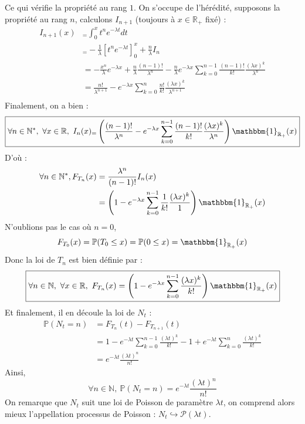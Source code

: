 \documentclass[a4paper, titlepage]{livret} %
\begin{document}
				Ce qui vérifie la propriété au rang $1$.
				On s'occupe de l'hérédité, supposons la propriété au rang $n$, calculons $I_{n+1}$ (toujours à $x \in \mathbb{R}_{+}$ fixé) :
				\[\begin{aligned}
					I_{n+1}(x) &_= \int_{0}^{x} t^{n} e^{-\lambda t}dt \\
						  	   &_= -\frac{1}{\lambda}\left[t^{n} e^{-\lambda t}\right]_{0}^{x} + \frac{n}{\lambda} I_{n}\\
						  	   & = -\frac{x^{n}}{\lambda}e^{-\lambda x} + \frac{n}{\lambda}\frac{(n-1)!}{\lambda^{n}} - \frac{n}{\lambda}e^{-\lambda x} \sum_{k = 0}^{n-1} \frac{(n-1)!}{k!}\frac{(\lambda x)^{k}}{\lambda^{n}}\\
						  	   & = \frac{n!}{\lambda^{n+1}} - e^{-\lambda x} \sum_{k = 0}^{n} \frac{n!}{k!}\frac{(\lambda x)^{k}}{\lambda^{n+1}}\\
				\end{aligned}\]
				Finalement, on a bien :
				\[\boxed{
					\forall n \in \mathbb{N}^{*}, \ \forall x \in \mathbb{R}, \ I_{n}(x)_= \left(\frac{(n-1)!}{\lambda^{n}} -e^{-\lambda x} \sum_{k = 0}^{n-1} \frac{(n-1)!}{k!}\frac{(\lambda x)^{k}}{\lambda^{n}}\right)\mathbbm{1}_{\mathbb{R}_{+}}(x)
				}\]
				D'où :
				\[\begin{aligned}
					\forall n \in \mathbb{N}^{*}, F_{T_{n}}(x) & = \frac{\lambda^{n}}{(n-1)!} I_{n}(x)\\
															   & = \left(1 -e^{-\lambda x} \sum_{k = 0}^{n-1} \frac{1}{k!}\frac{(\lambda x)^{k}}{1}\right)\mathbbm{1}_{\mathbb{R}_{+}}(x)\\
				\end{aligned}\]
				N'oublions pas le cas où $n = 0$,
				\[
					F_{T_{0}}(x) = \mathbb{P}(T_{0} \leq x) = \mathbb{P}(0 \leq x) = \mathbbm{1}_{\mathbb{R}_{+}}(x)
				\]
				Donc la loi de $T_{n}$ est bien définie par :
				\[\boxed{
					\forall n \in \mathbb{N}, \ \forall x \in \mathbb{R}, \ F_{T_{n}}(x) = \left(1 -e^{-\lambda x} \sum_{k = 0}^{n-1} \frac{(\lambda x)^{k}}{k!}\right)\mathbbm{1}_{\mathbb{R}_{+}}(x)\\
				}\]
				Et finalement, il en découle la loi de $N_{t}$ :
				\[\begin{aligned}
					\mathbb{P}(N_{t} = n) & = F_{T_{n}}(t) - F_{T_{n+1}}(t)\\
										  & = 1 -e^{-\lambda t} \sum_{k = 0}^{n-1} \frac{(\lambda t)^{k}}{k!} - 1 + e^{-\lambda t} \sum_{k = 0}^{n} \frac{(\lambda t)^{k}}{k!}\\
										  & = e^{-\lambda t}\frac{(\lambda t)^{n}}{n!}
				\end{aligned}\]
				Ainsi,
				\[\boxed{
					\forall n \in \mathbb{N}, \ \mathbb{P}(N_{t} = n) = e^{-\lambda t}\frac{(\lambda t)^{n}}{n!}
				}\]
				On remarque que $N_{t}$ suit une loi de Poisson de paramètre $\lambda t$, on comprend alors mieux l'appellation \og processus de Poisson \fg{} : $N_{t} \hookrightarrow \mathcal{P}(\lambda t)$.
\end{document}
